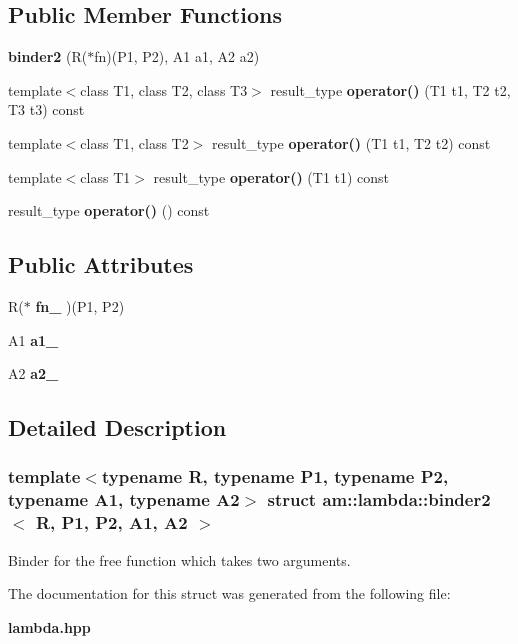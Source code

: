\subsection*{Public Member Functions}
\begin{CompactItemize}
\item 
\textbf{binder2} (R($\ast$fn)(P1, P2), A1 a1, A2 a2)\label{structam_1_1lambda_1_1binder2_4d517a5e99db7eb10225d490c802fa74}

\item 
template$<$class T1, class T2, class T3$>$ result\_\-type \textbf{operator()} (T1 t1, T2 t2, T3 t3) const \label{structam_1_1lambda_1_1binder2_8c204abc6133be2e95cd176639f52448}

\item 
template$<$class T1, class T2$>$ result\_\-type \textbf{operator()} (T1 t1, T2 t2) const\label{structam_1_1lambda_1_1binder2_2019db2e2568b959a5e5f5ad3b77f900}

\item 
template$<$class T1$>$ result\_\-type \textbf{operator()} (T1 t1) const \label{structam_1_1lambda_1_1binder2_3576ec06cf7e48b3b7346eeeecbb20dc}

\item 
result\_\-type \textbf{operator()} () const\label{structam_1_1lambda_1_1binder2_08f8cf7c190fc6e5e46e13010a9a86f9}

\end{CompactItemize}
\subsection*{Public Attributes}
\begin{CompactItemize}
\item 
R($\ast$ \textbf{fn\_\-} )(P1, P2)\label{structam_1_1lambda_1_1binder2_b214a0c003ee4e9c8ac97fda0bca30a9}

\item 
A1 \textbf{a1\_\-}\label{structam_1_1lambda_1_1binder2_ce8184c78e50af5a002839aba6b1351a}

\item 
A2 \textbf{a2\_\-}\label{structam_1_1lambda_1_1binder2_0de68b465afbb45b7304a96a1f6d671a}

\end{CompactItemize}


\subsection{Detailed Description}
\subsubsection*{template$<$typename R, typename P1, typename P2, typename A1, typename A2$>$ struct am::lambda::binder2$<$ R, P1, P2, A1, A2 $>$}

Binder for the free function which takes two arguments. 



The documentation for this struct was generated from the following file:\begin{CompactItemize}
\item 
{\bf lambda.hpp}\end{CompactItemize}
